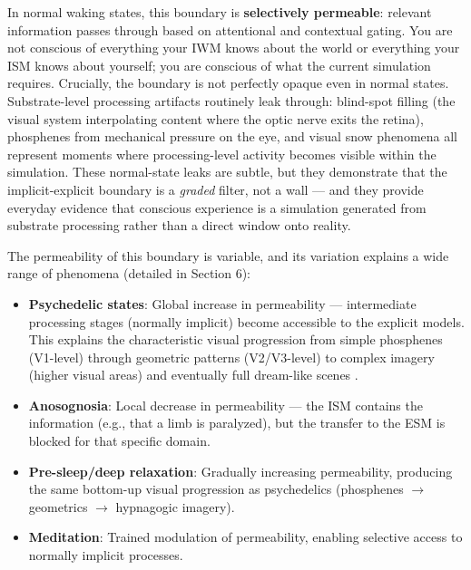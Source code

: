 \documentclass[12pt]{article}
\begin{document}
In normal waking states, this boundary is \textbf{selectively permeable}: relevant information passes through based on attentional and contextual gating. You are not conscious of everything your IWM knows about the world or everything your ISM knows about yourself; you are conscious of what the current simulation requires. Crucially, the boundary is not perfectly opaque even in normal states. Substrate-level processing artifacts routinely leak through: blind-spot filling (the visual system interpolating content where the optic nerve exits the retina), phosphenes from mechanical pressure on the eye, and visual snow phenomena all represent moments where processing-level activity becomes visible within the simulation. These normal-state leaks are subtle, but they demonstrate that the implicit-explicit boundary is a \emph{graded} filter, not a wall --- and they provide everyday evidence that conscious experience is a simulation generated from substrate processing rather than a direct window onto reality.

The permeability of this boundary is variable, and its variation explains a wide range of phenomena (detailed in Section 6):

\begin{itemize}
\item \textbf{Psychedelic states}: Global increase in permeability --- intermediate processing stages (normally implicit) become accessible to the explicit models. This explains the characteristic visual progression from simple phosphenes (V1-level) through geometric patterns (V2/V3-level) to complex imagery (higher visual areas) and eventually full dream-like scenes \citep{CarhartHarris2014}.
\item \textbf{Anosognosia}: Local decrease in permeability --- the ISM contains the information (e.g., that a limb is paralyzed), but the transfer to the ESM is blocked for that specific domain.
\item \textbf{Pre-sleep/deep relaxation}: Gradually increasing permeability, producing the same bottom-up visual progression as psychedelics (phosphenes $\rightarrow$ geometrics $\rightarrow$ hypnagogic imagery).
\item \textbf{Meditation}: Trained modulation of permeability, enabling selective access to normally implicit processes.
\end{itemize}
\end{document}
